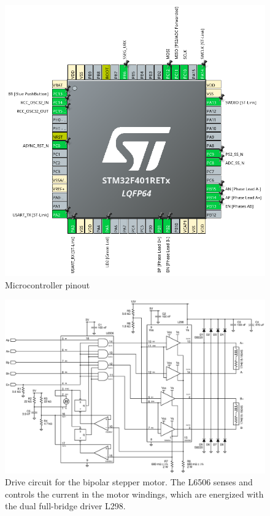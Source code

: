\documentclass[]{article}
\begin{document}
\begin{figure}
    \centering
    \includegraphics[width=.65\linewidth]{gfx/mcu_pinout.png}
    \caption{Microcontroller pinout}
    \label{fig:mcu_pins}
\end{figure}

\begin{figure}
    \centering
    \includegraphics[width=.8\linewidth]{gfx/motor_board.eps}
    \caption{Drive circuit for the bipolar stepper motor. The L6506 senses and controls the current in the motor windings, which are energized with the dual full-bridge driver L298.}
    \label{fig:motor_bd}
\end{figure}
\end{document}
